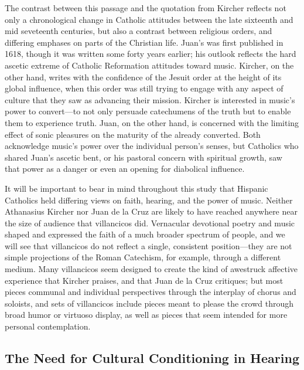 The contrast between this passage and the quotation from Kircher reflects not only a chronological change in Catholic attitudes between the late sixteenth and mid seveteenth centuries, but also a contrast between religious orders, and differing emphases on parts of the Christian life.
Juan's  was first published in 1618, though it was written some forty years earlier; his outlook reflects the hard ascetic extreme of Catholic Reformation attitudes toward music.
Kircher, on the other hand, writes with the confidence of the Jesuit order at the height of its global influence, when this order was still trying to engage with any aspect of culture that they saw as advancing their mission.
Kircher is interested in music's power to convert---to not only persuade catechumens of the truth but to enable them to experience truth.
Juan, on the other hand, is concerned with the limiting effect of sonic pleasures on the maturity of the already converted.
Both acknowledge music's power over the individual person's senses, but Catholics who shared Juan's ascetic bent, or his pastoral concern with spiritual growth, saw that power as a danger or even an opening for diabolical influence.

It will be important to bear in mind throughout this study that Hispanic Catholics held differing views on faith, hearing, and the power of music.
Neither Athanasius Kircher nor Juan de la Cruz are likely to have reached anywhere near the size of audience that villancicos did.
Vernacular devotional poetry and music shaped and expressed the faith of a much broader spectrum of people, and we will see that villancicos do not reflect a single, consistent position---they are not simple projections of the Roman Catechism, for example, through a different medium.
Many villancicos seem designed to create the kind of awestruck affective experience that Kircher praises, and that Juan de la Cruz critiques; but most pieces communal and individual perspectives through the interplay of chorus and soloists, and sets of villancicos include pieces meant to please the crowd through broad humor or virtuoso display, as well as pieces that seem intended for more personal contemplation.

\subsection{The Need for Cultural Conditioning in Hearing}

